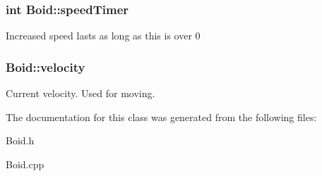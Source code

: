 \subsubsection[{\texorpdfstring{speed\+Timer}{speedTimer}}]{\setlength{\rightskip}{0pt plus 5cm}int Boid\+::speed\+Timer}\hypertarget{class_boid_a67c611146020a06068a82e5ebf9bf837}{}\label{class_boid_a67c611146020a06068a82e5ebf9bf837}
Increased speed lasts as long as this is over 0 
\subsubsection[{\texorpdfstring{velocity}{velocity}}]{ Boid\+::velocity}\hypertarget{class_boid_af79ca165b4d1a6ad1db2cbc534095bab}{}\label{class_boid_af79ca165b4d1a6ad1db2cbc534095bab}
Current velocity. Used for moving. 

The documentation for this class was generated from the following files\+:\begin{DoxyCompactItemize}
\item 
Boid.\+h\item 
Boid.\+cpp\end{DoxyCompactItemize}
